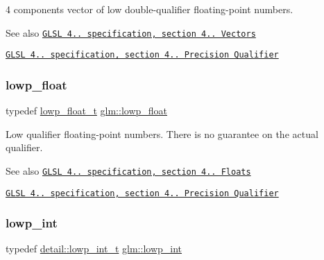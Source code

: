 4 components vector of low double-\/qualifier floating-\/point numbers.

\begin{DoxySeeAlso}{See also}
\href{http://www.opengl.org/registry/doc/GLSLangSpec.4.20.8.pdf}{\tt G\+L\+SL 4.. specification, section 4.. Vectors} 

\href{http://www.opengl.org/registry/doc/GLSLangSpec.4.20.8.pdf}{\tt G\+L\+SL 4.. specification, section 4.. Precision Qualifier} 
\end{DoxySeeAlso}
\mbox{\label{group__core__precision_ga2887fbc729ac5c1c5caeb7cd57a7145c}} 
\subsubsection{\texorpdfstring{lowp\+\_\+float}{lowp\_float}}
{\footnotesize\ttfamily typedef \mbox{\hyperlink{namespaceglm_a0a43b64238afac063f27ee7620205bf2}{lowp\+\_\+float\+\_\+t}} \mbox{\hyperlink{group__core__precision_ga2887fbc729ac5c1c5caeb7cd57a7145c}{glm\+::lowp\+\_\+float}}}

Low qualifier floating-\/point numbers. There is no guarantee on the actual qualifier.

\begin{DoxySeeAlso}{See also}
\href{http://www.opengl.org/registry/doc/GLSLangSpec.4.20.8.pdf}{\tt G\+L\+SL 4.. specification, section 4.. Floats} 

\href{http://www.opengl.org/registry/doc/GLSLangSpec.4.20.8.pdf}{\tt G\+L\+SL 4.. specification, section 4.. Precision Qualifier} 
\end{DoxySeeAlso}
\mbox{\label{group__core__precision_ga4681244bf4a184734f03aa9df4e3d288}} 
\subsubsection{\texorpdfstring{lowp\+\_\+int}{lowp\_int}}
{\footnotesize\ttfamily typedef \mbox{\hyperlink{namespaceglm_1_1detail_a030a8128e369fc1f9c7982dc68a78ba7}{detail\+::lowp\+\_\+int\+\_\+t}} \mbox{\hyperlink{group__core__precision_ga4681244bf4a184734f03aa9df4e3d288}{glm\+::lowp\+\_\+int}}}

